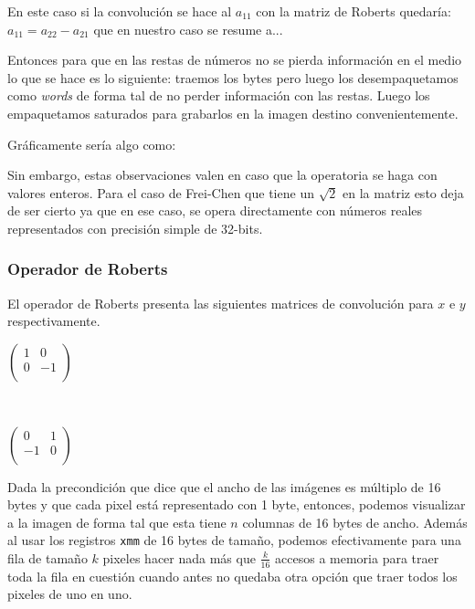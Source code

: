 En este caso si la convolución se hace al $a_{11}$ con la matriz de Roberts quedaría: $a_{11} = a_{22} - a_{21}$ que en nuestro caso se resume a...

Entonces para que en las restas de números no se pierda información en el medio lo que se hace es lo siguiente: traemos los bytes pero luego los desempaquetamos como \emph{words} de forma tal de no perder información con las restas. Luego los empaquetamos saturados para grabarlos en la imagen destino convenientemente. 

\pagebreak
Gráficamente sería algo como: 


Sin embargo, estas observaciones valen en caso que la operatoria se haga con valores enteros. Para el caso de Frei-Chen que tiene un $\sqrt{2}$ en la matriz esto deja de ser cierto ya que en ese caso, se opera directamente con números reales representados con precisión simple de 32-bits.

\subsubsection{Operador de Roberts}

El operador de Roberts presenta las siguientes matrices de convolución para $x$ e $y$ respectivamente.



\begin{center}
\begin{minipage}{0.30 \textwidth}
$\begin{pmatrix}
1 & 0 \\
0 & -1  \\
\end{pmatrix}$
\end{minipage}
\ \ 
 \begin{minipage}{0.30 \textwidth}
$\begin{pmatrix}
0 & 1 \\
-1 & 0 \\
\end{pmatrix}$
\end{minipage}
\end{center}

Dada la precondición que dice que el ancho de las imágenes es múltiplo de 16 bytes y que cada pixel está representado con 1 byte, entonces, podemos visualizar a la imagen de forma tal que esta tiene $n$ columnas de 16 bytes de ancho. Además al usar los registros \texttt{xmm} de 16 bytes de tamaño, podemos efectivamente para una fila de tamaño $k$ pixeles hacer nada más que $\frac{k}{16}$ accesos a memoria para traer toda la fila en cuestión cuando antes no quedaba otra opción que traer todos los pixeles de uno en uno. 

